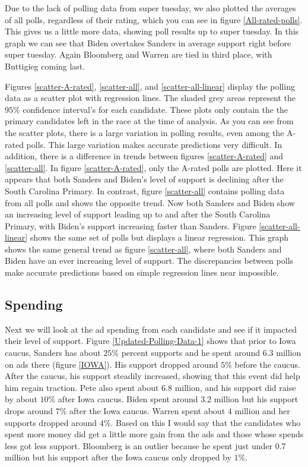 Due to the lack of polling data from super tuesday, we also plotted the averages of all polls, regardless of their rating, which you can see in figure \ref{All-rated-polls}. This gives us a little more data, showing poll results up to super tuesday. In this graph we can see that Biden overtakes Sanders in average support right before super tuesday. Again Bloomberg and Warren are tied in third place, with Buttigieg coming last.

Figures \ref{scatter-A-rated}, \ref{scatter-all}, and \ref{scatter-all-linear} display the polling data as a scatter plot with regression lines. The shaded grey areas represent the $95\%$ confidence interval's for each candidate. These plots only contain the the primary candidates left in the race at the time of analysis. As you can see from the scatter plots, there is a large variation in polling results, even among the A-rated polls. This large variation makes accurate predictions very difficult. In addition, there is a difference in trends between figures \ref{scatter-A-rated} and \ref{scatter-all}. In figure \ref{scatter-A-rated}, only the A-rated polls are plotted. Here it appears that both Sanders and Biden's level of support is declining after the South Carolina Primary. In contrast, figure \ref{scatter-all} contains polling data from all polls and shows the opposite trend. Now both Sanders and Biden show an increasing level of support leading up to and after the South Carolina Primary, with Biden's support increasing faster than Sanders. Figure \ref{scatter-all-linear} shows the same set of polls but displays a linear regression. This graph shows the same general trend as figure \ref{scatter-all}, where both Sanders and Biden have an ever increasing level of support. The discrepancies between polls make accurate predictions based on simple regression lines near impossible.

\subsection{Spending}

Next we will look at the ad spending from each candidate and see if it impacted their level of support. Figure \ref{Updated-Polling-Data-1} shows that prior to Iowa caucus, Sanders has about $25\%$ percent supports and he spent around 6.3 million on ads there (figure \ref{IOWA}). His support dropped around $5\%$ before the caucus. After the caucus, his support steadily increased, showing that this event did help him regain traction. Pete also spent about 6.8 million, and his support did raise by about $10\%$ after Iowa caucus. Biden spent around 3.2 million but his support drops around $7\%$ after the Iowa caucus. Warren spent about 4 million and her supports dropped around $4\%$. Based on this I would say that the candidates who spent more money did get a little more gain from the ads and those whose spends less got less support. Bloomberg is an outlier because he spent just under 0.7 million but his support after the Iowa caucus only dropped by $1\%$.

